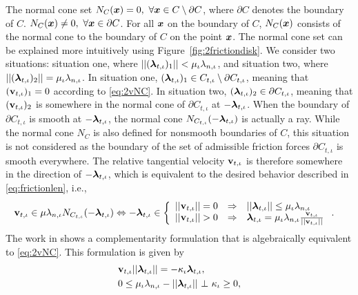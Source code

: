 \documentclass[../DC2017114Bouma.tex]{subfiles}
\begin{document}
The normal cone set $N_{C}(\xb) = 0,\ \forall\xb\in C\setminus \partial C$, where $\partial C$ denotes the boundary of $C$. $N_{C}({\boldsymbol{x}}) \neq 0,\ \forall{\boldsymbol{x}}\in \partial C$. For all ${\boldsymbol{x}}$ on the boundary of $C$, $N_{C}({\boldsymbol{x}})$ consists of the normal cone to the boundary of $C$ on the point ${\boldsymbol{x}}$. The normal cone set can be explained more intuitively using Figure~\ref{fig:2frictiondisk}. We consider two situations: situation one, where $||(\boldsymbol{\lambda}_{t,\iota})_1|| < \mu_{\iota}\lambda_{n,\iota}$, and situation two, where $||(\boldsymbol{\lambda}_{t,\iota})_2|| = \mu_{\iota}\lambda_{n,\iota}$. In situation one, $(\boldsymbol{\lambda}_{t,\iota})_1 \in C_{t,\iota}\setminus \partial C_{t,\iota}$, meaning that $(\mathbf{v}_{t,\iota})_1 = 0$ according to \eqref{eq:2vNC}. In situation two, $(\boldsymbol{\lambda}_{t,\iota})_2 \in \partial C_{t,\iota}$, meaning that $(\mathbf{v}_{t,\iota})_2$ is somewhere in the normal cone of $\partial C_{t,\iota}$ at $-\boldsymbol{\lambda}_{t,\iota}$. When the boundary of $\partial C_{t,\iota}$ is smooth at $-\boldsymbol{\lambda}_{t,\iota}$, the normal cone $N_{C_{t,\iota}}(-\boldsymbol{\lambda}_{t,\iota})$ is actually a ray. While the normal cone $N_C$ is also defined for nonsmooth boundaries of $C$, this situation is not considered as the boundary of the set of admissible friction forces $\partial C_{t,\iota}$ is smooth everywhere. The relative tangential velocity $\mathbf{v}_{t,\iota}$ is therefore somewhere in the direction of $-\boldsymbol{\lambda}_{t,\iota}$, which is equivalent to the desired behavior described in \eqref{eq:frictionlen}, i.e.,
\begin{align}
\vbf_{t,\iota} &\in \mu\lambda_{n,\iota}N_{C_{t,\iota}}(-\lambdab_{t,\iota}) \Leftrightarrow -\lambdab_{t,\iota} \in \left\{ \begin{array}{lll}
||\vbf_{t,\iota}||=0 & \Rightarrow & ||\lambdab_{t,\iota}||\leq\mu_{\iota}\lambda_{n,\iota}\\
||\vbf_{t,\iota}||>0 & \Rightarrow & \lambdab_{t,\iota} = \mu_{\iota}\lambda_{n,\iota}\frac{\vbf_{t,\iota}}{||\vbf_{t,\iota}||}
\end{array}\right. .\label{eq:frictiondir}
\end{align}
%
The work in \cite{Anitescu2006} shows a complementarity formulation that is algebraically equivalent to \eqref{eq:2vNC}. This formulation is given by
\begin{align}
&\vbf_{t,\iota}||\lambdab_{t,\iota}|| = -\kappa_{\iota}\lambdab_{t,\iota},\label{eq:coulomb1}\\
&0\leq \mu_{\iota}\lambda_{n,\iota} - ||\lambdab_{t,\iota}||\ \bot\ \kappa_{\iota} \geq 0,\label{eq:coulomb2}
\end{align}
\end{document}
